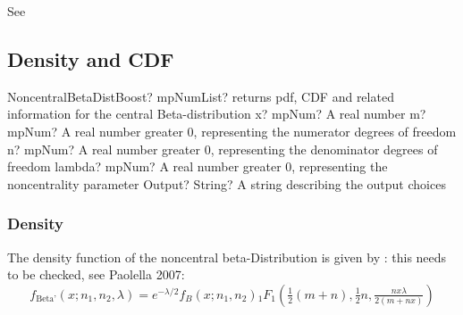 See \cite{Tiwari_1997}



\subsection{Density and CDF}

\begin{mpFunctionsExtract}
	\mpFunctionFive
	{NoncentralBetaDistBoost? mpNumList? returns pdf, CDF and related information for the central Beta-distribution}
	{x? mpNum? A real number}
	{m? mpNum? A real number greater 0, representing the numerator  degrees of freedom}
	{n? mpNum? A real number greater 0, representing the denominator degrees of freedom}
	{lambda? mpNum? A real number greater 0, representing the noncentrality parameter}
	{Output? String? A string describing the output choices}
\end{mpFunctionsExtract}



\subsubsection{Density}
\label{NoncentralBetaDistributionDensity}
The density function of the noncentral beta-Distribution is given by \citep{Wang1993}: this needs to be checked, see Paolella 2007:
\begin{equation}
	f_{\text{Beta'}}(x;n_1,n_2,\lambda) = e^{-\lambda/2} f_{B}(x;n_1,n_2) {}_1F_1 \left(\tfrac{1}{2}(m+n), \tfrac{1}{2}n, \tfrac{n x \lambda}{2(m+n x)}\right)
\end{equation}


\label{NoncentralBetaDistributionCDF}
%

